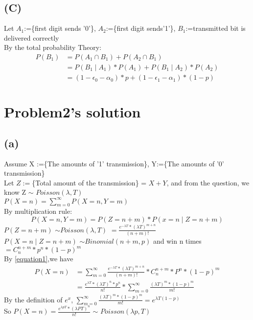 \documentclass[a4paper,11pt]{article} %
\begin{document}
\subsection{(C)}
Let $A_1$:=\{first digit sends '0'\}, $A_2$:=\{first digit sends'1'\}, $B_1$:={transmitted bit is delivered correctly}\\
By the total probability Theory:
\begin{align*}
    P(B_1) &= P(A_1 \cap B_1)+P(A_2 \cap B_1)\\
           &= P(B_1 \mid A_1)* P(A_1)+P(B_1 \mid A_2) * P(A_2)\\
           &= (1 - \epsilon_0 - \alpha_0)*p+(1- \epsilon_1 -\alpha_1)*(1-p)
\end{align*}

\section{Problem2's solution}
\subsection{(a)}
Assume X :=\{The amounts of '1' transmission\}, Y:=\{The amounts of '0' transmission\}\\
Let $Z:=$\{Total amount of the transmission\} = $X+Y$, and from the question, we know Z $\sim$ $Poisson(\lambda, T)$\\
$P(X=n) = \sum_{m=0}^{\infty}P(X=n,Y=m)$\\
By multiplication rule:\\
\begin{equation}
\label{equation1}
P(X=n,Y=m) = P(Z=n+m)*P(x=n \mid Z=n+m)
\end{equation}
$P(Z=n+m)$ $\sim Poisson(\lambda, T)$ $=\frac{e^{-\lambda T}*(\lambda T)^{m+n}}{(n+m)!}$\\
$P(X=n \mid Z=n+m)$ $\sim Binomial(n+m,p)$ and win n times \\$=C_{n}^{n+m}*p^n*(1-p)^m$\\
By \eqref{equation1},we have
\begin{align*}
    P(X=n) &=\sum_{m=0}^{\infty} \frac{e^{-\lambda T}*(\lambda T)^{m+n}}{(n+m)!}*C_{n}^{n+m}*P^n*(1-p)^m\\
           &= \frac{e^{\lambda T}*(\lambda T)^n *p^n}{n!} * \sum_{m=0}^{\infty}\frac{(\lambda T)^m*(1-p)^m}{m!}
\end{align*}
By the definition of $e^x$, $\sum_{m=0}^{\infty}\frac{(\lambda T)^m*(1-p)^m}{m!} = e^{\lambda T(1-p)}$\\
So $P(X=n) = \frac{e^{\lambda pT}*(\lambda PT)^n}{n!}$ $\sim$ $Poisson(\lambda p, T)$
\end{document}

